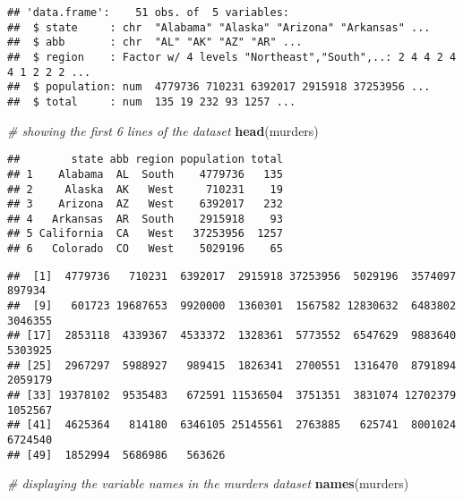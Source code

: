 \documentclass[
]{article}
\newenvironment{Shaded}{\begin{snugshade}}{\end{snugshade}}
\newcommand{\CommentTok}[1]{\textcolor[rgb]{0.56,0.35,0.01}{\textit{#1}}}
\newcommand{\KeywordTok}[1]{\textcolor[rgb]{0.13,0.29,0.53}{\textbf{#1}}}
\newcommand{\NormalTok}[1]{#1}
\newcommand{\OperatorTok}[1]{\textcolor[rgb]{0.81,0.36,0.00}{\textbf{#1}}}
\begin{document}
\begin{verbatim}
## 'data.frame':    51 obs. of  5 variables:
##  $ state     : chr  "Alabama" "Alaska" "Arizona" "Arkansas" ...
##  $ abb       : chr  "AL" "AK" "AZ" "AR" ...
##  $ region    : Factor w/ 4 levels "Northeast","South",..: 2 4 4 2 4 4 1 2 2 2 ...
##  $ population: num  4779736 710231 6392017 2915918 37253956 ...
##  $ total     : num  135 19 232 93 1257 ...
\end{verbatim}

\begin{Shaded}
\begin{Highlighting}[]
\CommentTok{# showing the first 6 lines of the dataset}
\KeywordTok{head}\NormalTok{(murders)}
\end{Highlighting}
\end{Shaded}

\begin{verbatim}
##        state abb region population total
## 1    Alabama  AL  South    4779736   135
## 2     Alaska  AK   West     710231    19
## 3    Arizona  AZ   West    6392017   232
## 4   Arkansas  AR  South    2915918    93
## 5 California  CA   West   37253956  1257
## 6   Colorado  CO   West    5029196    65
\end{verbatim}

\begin{Shaded}
\end{Shaded}

\begin{verbatim}
##  [1]  4779736   710231  6392017  2915918 37253956  5029196  3574097   897934
##  [9]   601723 19687653  9920000  1360301  1567582 12830632  6483802  3046355
## [17]  2853118  4339367  4533372  1328361  5773552  6547629  9883640  5303925
## [25]  2967297  5988927   989415  1826341  2700551  1316470  8791894  2059179
## [33] 19378102  9535483   672591 11536504  3751351  3831074 12702379  1052567
## [41]  4625364   814180  6346105 25145561  2763885   625741  8001024  6724540
## [49]  1852994  5686986   563626
\end{verbatim}

\begin{Shaded}
\begin{Highlighting}[]
\CommentTok{# displaying the variable names in the murders dataset}
\KeywordTok{names}\NormalTok{(murders)}
\end{Highlighting}
\end{Shaded}
\end{document}
